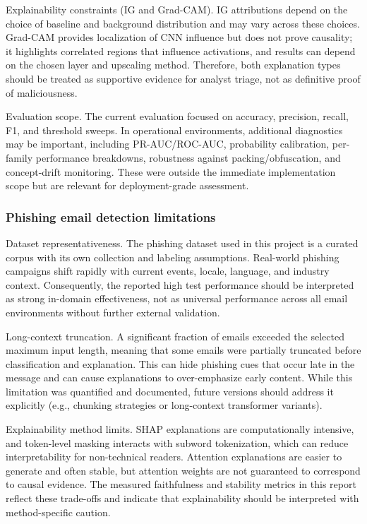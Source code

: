 \documentclass[conference]{IEEEtran}
\begin{document}
Explainability constraints (IG and Grad-CAM). IG attributions depend on the choice of baseline and background distribution and may vary across these choices. Grad-CAM provides localization of CNN influence but does not prove causality; it highlights correlated regions that influence activations, and results can depend on the chosen layer and upscaling method. Therefore, both explanation types should be treated as supportive evidence for analyst triage, not as definitive proof of maliciousness.

Evaluation scope. The current evaluation focused on accuracy, precision, recall, F1, and threshold sweeps. In operational environments, additional diagnostics may be important, including PR-AUC/ROC-AUC, probability calibration, per-family performance breakdowns, robustness against packing/obfuscation, and concept-drift monitoring. These were outside the immediate implementation scope but are relevant for deployment-grade assessment.

\subsubsection{Phishing email detection limitations}

Dataset representativeness. The phishing dataset used in this project is a curated corpus with its own collection and labeling assumptions. Real-world phishing campaigns shift rapidly with current events, locale, language, and industry context. Consequently, the reported high test performance should be interpreted as strong in-domain effectiveness, not as universal performance across all email environments without further external validation.

Long-context truncation. A significant fraction of emails exceeded the selected maximum input length, meaning that some emails were partially truncated before classification and explanation. This can hide phishing cues that occur late in the message and can cause explanations to over-emphasize early content. While this limitation was quantified and documented, future versions should address it explicitly (e.g., chunking strategies or long-context transformer variants).

Explainability method limits. SHAP explanations are computationally intensive, and token-level masking interacts with subword tokenization, which can reduce interpretability for non-technical readers. Attention explanations are easier to generate and often stable, but attention weights are not guaranteed to correspond to causal evidence. The measured faithfulness and stability metrics in this report reflect these trade-offs and indicate that explainability should be interpreted with method-specific caution.
\end{document}
